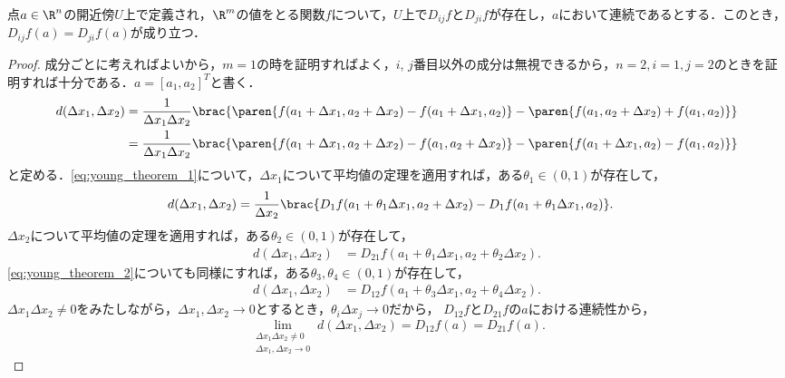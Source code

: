 \documentclass[a4paper,10pt]{ltjsarticle}
\begin{document}
\begin{MyTheorem}
  点$a\in\R^n$の開近傍$U$上で定義され，$\R^m$の値をとる関数$f$について，$U$上で$D_{ij}f$と$D_{ji}f$が存在し，$a$において連続であるとする．このとき，$D_{ij}f(a) = D_{ji}f(a)$が成り立つ．
\end{MyTheorem}
\begin{proof}
  成分ごとに考えればよいから，$m=1$の時を証明すればよく，$i$, $j$番目以外の成分は無視できるから，$n=2, i=1, j=2$のときを証明すれば十分である．\(a=[a_1, a_2]^T\)と書く．
  \begin{align}
    d(\Delta x_1, \Delta x_2) & = \frac{1}{\Delta x_1\Delta x_2}\brac{\paren{f(a_1 + \Delta x_1, a_2 + \Delta x_2) - f(a_1 + \Delta x_1, a_2)} - \paren{f(a_1, a_2 + \Delta x_2) + f(a_1, a_2)}} \label{eq:young_theorem_1}\\
    & = \frac{1}{\Delta x_1\Delta x_2}\brac{\paren{f(a_1 + \Delta x_1, a_2 + \Delta x_2) - f(a_1, a_2 + \Delta x_2)} - \paren{f(a_1 + \Delta x_1, a_2) - f(a_1, a_2)}}  \label{eq:young_theorem_2}
  \end{align}
  と定める．\cref{eq:young_theorem_1}について，$\Delta x_1$について平均値の定理を適用すれば，ある$\theta_1 \in (0, 1)$が存在して，
  \begin{align*}
    d(\Delta x_1, \Delta x_2) & = \frac{1}{\Delta x_2}\brac{D_1f(a_1 + \theta_1\Delta x_1, a_2 + \Delta x_2) - D_1f(a_1 + \theta_1\Delta x_1, a_2)}.
  \end{align*}
  $\Delta x_2$について平均値の定理を適用すれば，ある$\theta_2 \in (0, 1)$が存在して，
  \begin{align*}
    d(\Delta x_1, \Delta x_2) & = D_{21}f(a_1 + \theta_1\Delta x_1, a_2 + \theta_2\Delta x_2).
  \end{align*}
  \cref{eq:young_theorem_2}についても同様にすれば，ある$\theta_3, \theta_4 \in (0, 1)$が存在して，
  \begin{align*}
    d(\Delta x_1, \Delta x_2) & = D_{12}f(a_1 + \theta_3\Delta x_1, a_2 + \theta_4\Delta x_2).
  \end{align*}
  $\Delta x_1\Delta x_2 \ne 0$をみたしながら，$\Delta x_1, \Delta x_2 \to 0$とするとき，$\theta_i\Delta x_j \to 0$だから，
  $D_{12}f$と$D_{21}f$の$a$における連続性から，
  \[ \lim_{\substack{\Delta x_1\Delta x_2 \ne 0 \\ \Delta x_1, \Delta x_2 \to 0}} d(\Delta x_1, \Delta x_2) = D_{12}f(a) = D_{21}f(a). \]
\end{proof}
\end{document}
